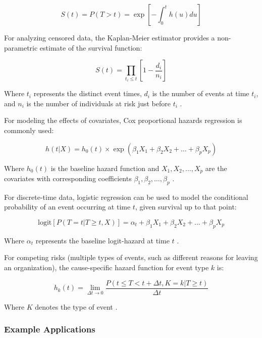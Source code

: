 \documentclass[../main.tex]{subfiles}
\begin{document}
\[S(t) = P(T > t) = \exp\left[-\int_0^t h(u)du\right]\]

For analyzing censored data, the Kaplan-Meier estimator provides a non-parametric estimate of the survival function:

\[S(t) = \prod_{t_i \leq t} \left[1 - \frac{d_i}{n_i}\right]\]

Where \(t_i\) represents the distinct event times, \(d_i\) is the number of events at time \(t_i\), and \(n_i\) is the number of individuals at risk just before \(t_i\) \parencite{code2020event}.

For modeling the effects of covariates, Cox proportional hazards regression is commonly used:

\[h(t|X) = h_0(t) \times \exp(\beta_1 X_1 + \beta_2 X_2 + \ldots + \beta_p X_p)\]

Where \(h_0(t)\) is the baseline hazard function and \(X_1, X_2, \ldots, X_p\) are the covariates with corresponding coefficients \(\beta_1, \beta_2, \ldots, \beta_p\) \parencite{code2020event}.

For discrete-time data, logistic regression can be used to model the conditional probability of an event occurring at time \(t\), given survival up to that point:

\[\text{logit}[P(T = t | T \geq t, X)] = \alpha_t + \beta_1 X_1 + \beta_2 X_2 + \ldots + \beta_p X_p\]

Where \(\alpha_t\) represents the baseline logit-hazard at time \(t\) \parencite{allison1982discrete}.

For competing risks (multiple types of events, such as different reasons for leaving an organization), the cause-specific hazard function for event type \(k\) is:

\[h_k(t) = \lim_{\Delta t \to 0} \frac{P(t \leq T < t+\Delta t, K = k | T \geq t)}{\Delta t}\]

Where \(K\) denotes the type of event \parencite{code2020event}.

\subsubsection{Example Applications}
\end{document}
